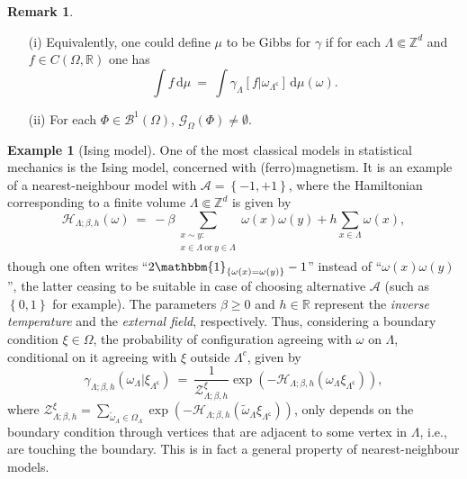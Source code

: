\documentclass[12pt]{article}
\newcommand{\A}{\mathcal{A}}
\newcommand{\BB}{\mathscr{B}}
\renewcommand{\d}{\mathrm{d}}
\newcommand{\G}{\mathcal{G}}
\renewcommand{\H}{\mathcal{H}}
\newcommand{\R}{\mathbb{R}}
\newcommand{\Z}{\mathbb{Z}}
\newcommand{\ZZ}{\mathcal{Z}}
\newcommand{\set}[1]{\left\{#1\right\}}
\newcommand{\1}{\mathbbm{1}}
\renewcommand{\c}{\mathsf{c}}
\newcommand{\5}{\vspace{0.5cm}}
\renewcommand{\tilde}{\widetilde}
\theoremstyle{definition}
\newtheorem{ex}[thm]{Example}
\newtheorem{rem}[thm]{Remark}
\begin{document}
\begin{rem}
~
\begin{itemize}
	\item[(i)] Equivalently, one could define $\mu$ to be Gibbs for $\gamma$ if for each $\Lambda\Subset\Z^d$ and $f\in C(\Omega,\R)$ one has
	$$\int f\,\d\mu ~=~ \int\gamma_\Lambda[f|\omega_{\Lambda^\c}]\,\d\mu(\omega).$$
	\item[(ii)] For each $\Phi\in\BB^1(\Omega)$, $\G_\Omega(\Phi)\neq\emptyset$.
\end{itemize}
\end{rem}

\begin{ex}[Ising model]
One of the most classical models in statistical mechanics is the Ising model, concerned with (ferro)magnetism. It is an example of a nearest-neighbour model with $\A=\set{-1,+1}$, where the Hamiltonian corresponding to a finite volume $\Lambda\Subset\Z^d$ is given by
$$\H_{\Lambda;\beta,h}(\omega) ~=~ -\beta\!\!\!\!\!\!\!\sum_{\substack{x\sim y:\\x\in\Lambda~\text{or}~y\in\Lambda\\}}\!\!\!\!\!\!\!\omega(x)\omega(y) + h\sum_{x\in\Lambda}\omega(x),$$
though one often writes ``$2\1_{\set{\omega(x)=\omega(y)}}-1$'' instead of ``$\omega(x)\omega(y)$'', the latter ceasing to be suitable in case of choosing alternative $\A$ (such as $\set{0,1}$ for example). The parameters $\beta\geq 0$ and $h\in\R$ represent the \textit{inverse temperature} and the \textit{external field}, respectively. Thus, considering a boundary condition $\xi\in\Omega$, the probability of configuration agreeing with $\omega$ on $\Lambda$, conditional on it agreeing with $\xi$ outside $\Lambda^c$, given by
$$\gamma_{\Lambda;\beta,h}(\omega_\Lambda|\xi_{\Lambda^\c}) ~=~ \frac{1}{\ZZ_{\Lambda;\beta,h}^\xi}\exp(-\H_{\Lambda;\beta,h}(\omega_\Lambda\xi_{\Lambda^\c})),$$
where $\ZZ_{\Lambda;\beta,h}^\xi=\sum_{\tilde{\omega}_\Lambda\in\Omega_\Lambda}\exp(-\H_{\Lambda;\beta,h}(\tilde{\omega}_\Lambda\xi_{\Lambda^\c}))$, only depends on the boundary condition through vertices that are adjacent to some vertex in $\Lambda$, i.e., are touching the boundary. This is in fact a general property of nearest-neighbour models.
\end{ex}
\end{document}
